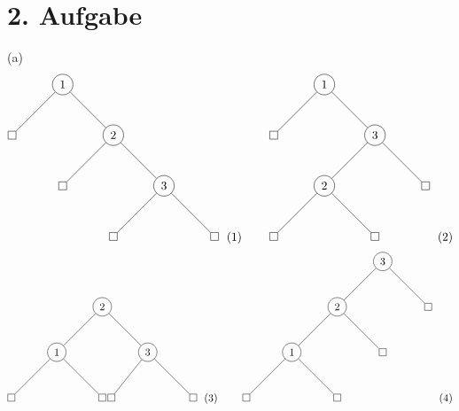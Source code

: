\documentclass[fleqn]{article}
\begin{document}
\pagestyle{main}

\section{2. Aufgabe}

(a)
$$
\begin{tikzpicture}
    \node(1) at (0,0)[circle, draw]{1};
    \node(2) at (1.5,-1.5)[circle, draw]{2};
    \node(3) at (3,-3)[circle, draw]{3};
    \node(1l) at (-1.5,-1.5)[draw]{};
    \node(2l) at (0,-3)[draw]{};
    \node(3l) at (1.5,-4.5)[draw]{};
    \node(3r) at (4.5,-4.5)[draw]{};
    \draw (1)--(2);
    \draw (1)--(1l);
    \draw (2)--(3);
    \draw (2)--(2l);
    \draw (3)--(3l);
    \draw (3)--(3r);
\end{tikzpicture}
\ \ (1) \ \ \ \ \ \ \
\begin{tikzpicture}
    \node(1) at (0,0)[circle, draw]{1};
    \node(2) at (1.5,-1.5)[circle, draw]{3};
    \node(3) at (0,-3)[circle, draw]{2};
    \node(1l) at (-1.5,-1.5)[draw]{};
    \node(2l) at (3,-3)[draw]{};
    \node(3l) at (-1.5,-4.5)[draw]{};
    \node(3r) at (1.5,-4.5)[draw]{};
    \draw (1)--(2);
    \draw (1)--(1l);
    \draw (2)--(3);
    \draw (2)--(2l);
    \draw (3)--(3l);
    \draw (3)--(3r);
\end{tikzpicture}
\ \ (2)
$$
$$
\begin{tikzpicture}
    \node(1) at (0,0)[circle, draw]{2};
    \node(2) at (-1.5,-1.5)[circle, draw]{1};
    \node(3) at (1.5,-1.5)[circle, draw]{3};
    \node(2l) at (-3,-3)[draw]{};
    \node(2r) at (0,-3)[draw]{};
    \node(3l) at (0.3,-3)[draw]{};
    \node(3r) at (3,-3)[draw]{};
    \draw (1)--(2);
    \draw (1)--(3);
    \draw (2)--(2r);
    \draw (2)--(2l);
    \draw (3)--(3l);
    \draw (3)--(3r);
\end{tikzpicture}
\ \ (3) \ \ \ \ \ \ \
\begin{tikzpicture}
    \node(1) at (0,0)[circle, draw]{3};
    \node(2) at (-1.5,-1.5)[circle, draw]{2};
    \node(3) at (-3,-3)[circle, draw]{1};
    \node(1l) at (1.5,-1.5)[draw]{};
    \node(2l) at (0,-3)[draw]{};
    \node(3l) at (-1.5,-4.5)[draw]{};
    \node(3r) at (-4.5,-4.5)[draw]{};
    \draw (1)--(2);
    \draw (1)--(1l);
    \draw (2)--(3);
    \draw (2)--(2l);
    \draw (3)--(3l);
    \draw (3)--(3r);
\end{tikzpicture}
\ \ (4)
$$
\end{document}
